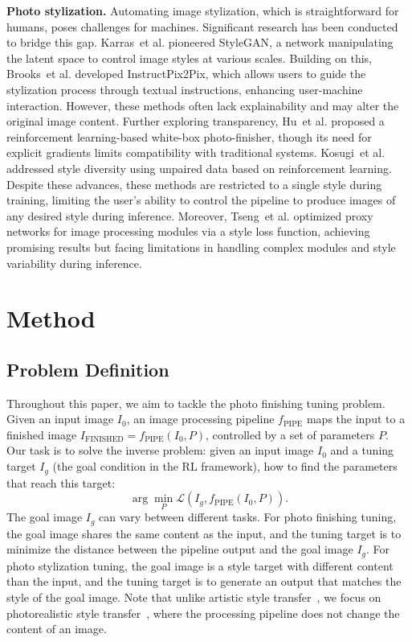 \documentclass{article}
\newcommand{\etal}{et al. }
\newcommand{\task}{photo finishing tuning\xspace}
\newcommand{\taskPFT}{photo finishing tuning\xspace}
\newcommand{\taskPST}{photo stylization tuning\xspace}
\begin{document}
\noindent\textbf{Photo stylization.} 
Automating image stylization, which is straightforward for humans, poses challenges for machines. Significant research has been conducted to bridge this gap. Karras~\etal\cite{karras2019style} pioneered StyleGAN, a network manipulating the latent space to control image styles at various scales. Building on this, Brooks~\etal\cite{brooks2023instructpix2pix} developed InstructPix2Pix, which allows users to guide the stylization process through textual instructions, enhancing user-machine interaction. However, these methods often lack explainability and may alter the original image content.
Further exploring transparency, Hu~\etal\cite{hu2018exposure} proposed a reinforcement learning-based white-box photo-finisher, though its need for explicit gradients limits compatibility with traditional systems. Kosugi~\etal\cite{kosugi2020unpaired} addressed style diversity using unpaired data based on reinforcement learning.  Despite these advances, these methods are restricted to a single style during training, limiting the user's ability to control the pipeline to produce images of any desired style during inference.
Moreover, Tseng~\etal\cite{tseng2022neural} optimized proxy networks for image processing modules via a style loss function, achieving promising results but facing limitations in handling complex modules and style variability during inference. 




\vspace{-10pt}
\section{Method}
\vspace{-8pt}

\subsection{Problem Definition}
\label{sec:3.1}

Throughout this paper, we aim to tackle the \task problem. Given an input image $I_0$, an image processing pipeline $f_{\text{PIPE}}$ maps the input to a finished image $I_{\text{FINISHED}} = f_{\text{PIPE}}(I_0, P)$, controlled by a set of parameters $P$. Our task is to solve the inverse problem: given an input image $I_0$ and a tuning target $I_g$ (the goal condition in the RL framework), how to find the parameters that reach this target:
\begin{equation}
\arg \min_P \mathcal{L}(I_g, f_{\text{PIPE}}(I_0, P)).
\end{equation}
The goal image $I_{g}$ can vary between different tasks. For \taskPFT, the goal image shares the same content as the input, and the tuning target is to minimize the distance between the pipeline output and the goal image $I_g$. For \taskPST, the goal image is a style target with different content than the input, and the tuning target is to generate an output that matches the style of the goal image. Note that unlike artistic style transfer~\cite{gatys2016image}, we focus on photorealistic style transfer~\cite{xia2020joint}, where the processing pipeline does not change the content of an image.
\end{document}
